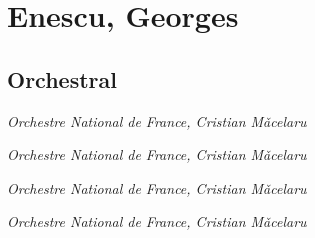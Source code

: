 \chapter{Enescu, Georges}
\label{cha:enescu}


\section{Orchestral}

 \textit{Orchestre National de France, Cristian M\v{a}celaru} 

 \textit{Orchestre National de France, Cristian M\v{a}celaru} 

 \textit{Orchestre National de France, Cristian M\v{a}celaru} 

 \textit{Orchestre National de France, Cristian M\v{a}celaru} 
